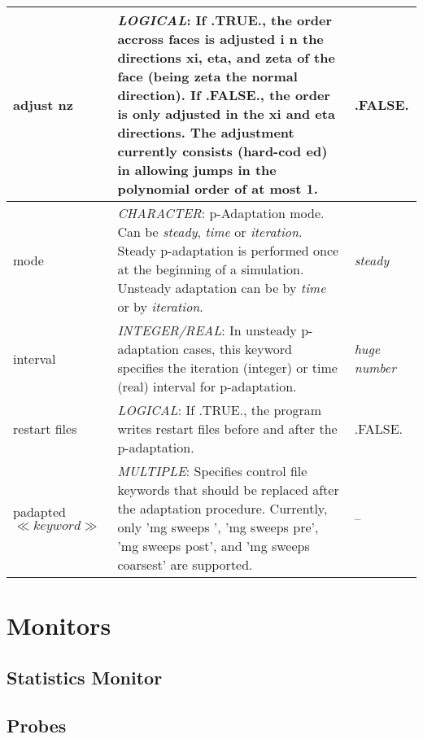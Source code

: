 \documentclass[a4paper,10pt]{report}
\begin{document}
\begin{longtable}{|p{4cm}|p{10cm}|p{2.2cm}|}
adjust nz & 
			\textit{LOGICAL}: If .TRUE., the order accross faces is adjusted i    n the directions xi, eta, and zeta of the face (being zeta the normal direction). If .FALSE., the     order is only adjusted in the xi and eta directions. The adjustment currently consists (hard-cod    ed) in allowing jumps in the polynomial order of at most 1. & 
					.FALSE. \\ \hline

mode & 
			\textit{CHARACTER}: p-Adaptation mode. Can be \textit{steady}, \textit{time} or \textit{iteration}. Steady p-adaptation is performed once at the beginning of a simulation. Unsteady adaptation can be by \textit{time} or by \textit{iteration}. &
					\textit{steady} \\ \hline

interval & 
			\textit{INTEGER/REAL}: In unsteady p-adaptation cases, this keyword specifies the iteration (integer) or time (real) interval for p-adaptation. &
					\textit{huge number} \\ \hline

restart files & 
			\textit{LOGICAL}: If .TRUE., the program writes restart files before and after the p-adaptation. &
					.FALSE. \\ \hline

padapted $\ll \textit{keyword} \gg$ &
			\textit{MULTIPLE}: Specifies control file keywords that should be replaced after the adaptation procedure. Currently, only 'mg sweeps         ', 'mg sweeps pre', 'mg sweeps post', and 'mg sweeps coarsest' are supported. &
					-- \\ \hline

\end{longtable}



\chapter{Monitors}



\section{Statistics Monitor}

\section{Probes}
\end{document}
